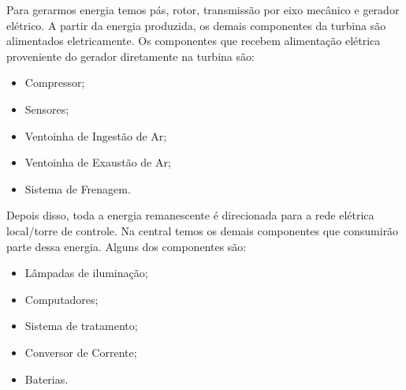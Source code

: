 Para gerarmos energia temos pás, rotor, transmissão por eixo mecânico e gerador elétrico. A partir da energia produzida, os demais componentes da turbina são alimentados eletricamente. Os componentes que recebem alimentação elétrica proveniente do gerador  diretamente na turbina são:
\begin{itemize}
\item Compressor;
\item Sensores;
\item Ventoinha de Ingestão de Ar;
\item Ventoinha de Exaustão de Ar;
\item Sistema de Frenagem.
\end{itemize}

Depois disso, toda a energia remanescente é direcionada para a rede elétrica local/torre de controle. Na central temos os demais componentes que consumirão parte dessa energia. Alguns dos componentes são:
\begin{itemize}
\item Lâmpadas de iluminação;
\item Computadores;
\item Sistema de tratamento;
\item Conversor de Corrente;
\item Baterias.

\end{itemize}